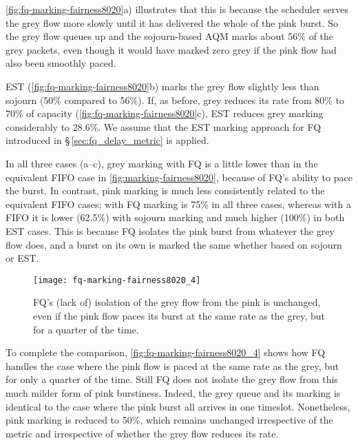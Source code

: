 \autoref{fig:fq-marking-fairness8020}a) illustrates that this is because the scheduler serves the grey flow more slowly until it has delivered the whole of the pink burst. So the grey flow queues up and the sojourn-based AQM marks about 56\% of the grey packets, even though it would have marked zero grey if the pink flow had also been smoothly paced.

EST (\autoref{fig:fq-marking-fairness8020}b) marks the grey flow slightly less than sojourn (50\% compared to 56\%). If, as before, grey reduces its rate from 80\% to 70\% of capacity  (\autoref{fig:fq-marking-fairness8020}c), EST reduces grey marking considerably to 28.6\%. We assume that the EST marking approach for FQ introduced in \S\,\ref{sec:fq_delay_metric} is applied.

In all three cases (a--c), grey marking with FQ is a little lower than in the equivalent FIFO case in \autoref{fig:marking-fairness8020}, because of FQ's ability to pace the burst. In contrast, pink marking is much less consistently related to the equivalent FIFO cases; with FQ marking is 75\% in all three cases, whereas with a FIFO it is lower (62.5\%) with sojourn marking and much higher (100\%) in both EST cases. This is because FQ isolates the pink burst from whatever the grey flow does, and a burst on its own is marked the same whether based on sojourn or EST.

\begin{figure}
	\centering
	\texttt{[image: fq-marking-fairness8020\_4]}
	\caption{FQ's (lack of) isolation of the grey flow from the pink is unchanged, even if the pink flow paces its burst at the same rate as the grey, but for a quarter of the time.}\label{fig:fq-marking-fairness8020_4}
\end{figure}

To complete the comparison, \autoref{fig:fq-marking-fairness8020_4} shows how FQ handles the case where the pink flow is paced at the same rate as the grey, but for only a quarter of the time. Still FQ does not isolate the grey flow from this much milder form of pink burstiness. Indeed, the grey queue and its marking is identical to the case where the pink burst all arrives in one timeslot. Nonetheless, pink marking is reduced to 50\%, which remains unchanged irrespective of the metric and irrespective of whether the grey flow reduces its rate.
